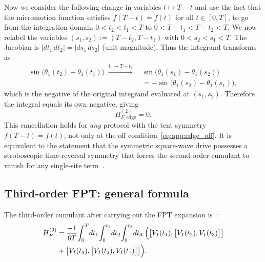 \documentclass[aps,prb,reprint,twocolumn,amsmath,amssymb,citeautoscript]{revtex4-2}
\begin{document}
Now we consider the following change in variables $t\mapsto T-t$ and use the fact that the micromotion function satisfies
$f(T-t)=f(t)$ for all $t\in[0,T]$, to go from the integration domain
$0<t_2<t_1<T$ to $0<T-t_1<T-t_2<T$. We now relabel the variables $(s_1,s_2):=(T-t_2,T-t_1)$ with $0<s_2<s_1<T$.
The Jacobian is $|dt_1\,dt_2|=|ds_1\,ds_2|$ (unit magnitude).
Thus the integrand transforms as
\begin{equation}
\begin{aligned}
  \sin\!\bigl(\theta_1(t_2)-\theta_1(t_1)\bigr)
\;\xrightarrow{t_i\to T-t_i}\;&
\sin\!\bigl(\theta_1(s_1)-\theta_1(s_2)\bigr)\\
&=-\sin\!\bigl(\theta_1(s_2)-\theta_1(s_1)\bigr),  
\end{aligned}
\label{eq:app:edge_TR_sign}
\end{equation}
which is the negative of the original integrand evaluated at
$(s_1,s_2)$.
Therefore the integral equals its own negative, giving
\begin{equation}
H_{F,\mathrm{edge}}^{(2)}=0.
\label{eq:app:edge_HF2_zero}
\end{equation}
This cancellation holds for \textit{any} protocol with the tent
symmetry $f(T-t)=f(t)$, not only at the off
condition~\eqref{eq:app:edge_off}.
It is equivalent to the statement that the symmetric square-wave
drive possesses a stroboscopic time-reversal symmetry that forces
the second-order cumulant to vanish for any single-site
term~\cite{Bukov2015AdvPhys}.


\subsection{Third-order FPT: general formula}
\label{app:edge:third_order}

The third-order cumulant after carrying out the FPT expansion
is~\cite{GhoshPaulSengupta2025Spin}:
\begin{equation}
\begin{aligned}
    H_F^{(3)}
&=\frac{-1}{6T}\!\int_0^T\!dt_1\!\int_0^{t_1}\!dt_2
\!\int_0^{t_2}\!dt_3\;\Bigl(
\bigl[V_I(t_1),\bigl[V_I(t_2),V_I(t_3)\bigr]\bigr]\\
&+\bigl[V_I(t_3),\bigl[V_I(t_2),V_I(t_1)\bigr]\bigr]
\Bigr).
\end{aligned}
\label{eq:app:edge_HF3_formula}
\end{equation}
\end{document}
